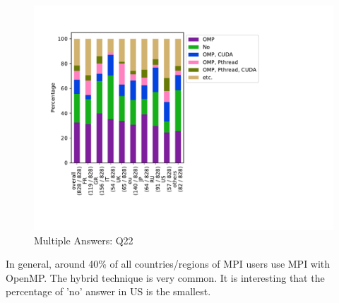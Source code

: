\begin{figure}[htb]
\begin{center}
\includegraphics[width=14cm]{../pdfs/Q22-mans.pdf}
\caption{Multiple Answers: Q22}
\label{fig:Q22-mans}
\end{center}
\end{figure}

In general, around 40\% of all countries/regions of MPI users
use MPI with OpenMP. The hybrid technique is very common.
It is interesting that the percentage of 'no' answer in US is the
smallest. 
